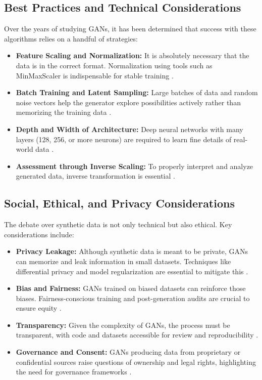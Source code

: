 \documentclass[12pt, draftclsnofoot, onecolumn]{IEEEtran}
\begin{document}
\subsection{Best Practices and Technical Considerations}
Over the years of studying GANs, it has been determined that success with these algorithms relies on a handful of strategies:

\begin{itemize}
    \item \textbf{Feature Scaling and Normalization:} It is absolutely necessary that the data is in the correct format. Normalization using tools such as MinMaxScaler is indispensable for stable training \cite{ref6,ref18}.
    
    \item \textbf{Batch Training and Latent Sampling:} Large batches of data and random noise vectors help the generator explore possibilities actively rather than memorizing the training data \cite{ref5,ref17}.
    
    \item \textbf{Depth and Width of Architecture:} Deep neural networks with many layers (128, 256, or more neurons) are required to learn fine details of real-world data \cite{ref16}.
    
    \item \textbf{Assessment through Inverse Scaling:} To properly interpret and analyze generated data, inverse transformation is essential \cite{ref14}.
\end{itemize}

\subsection{Social, Ethical, and Privacy Considerations}
The debate over synthetic data is not only technical but also ethical. Key considerations include:

\begin{itemize}
    \item \textbf{Privacy Leakage:} Although synthetic data is meant to be private, GANs can memorize and leak information in small datasets. Techniques like differential privacy and model regularization are essential to mitigate this \cite{ref3,ref18}.
    
    \item \textbf{Bias and Fairness:} GANs trained on biased datasets can reinforce those biases. Fairness-conscious training and post-generation audits are crucial to ensure equity \cite{ref2,ref6}.
    
    \item \textbf{Transparency:} Given the complexity of GANs, the process must be transparent, with code and datasets accessible for review and reproducibility \cite{ref1,ref13}.
    
    \item \textbf{Governance and Consent:} GANs producing data from proprietary or confidential sources raise questions of ownership and legal rights, highlighting the need for governance frameworks \cite{ref21,ref22}.
\end{itemize}
\end{document}
